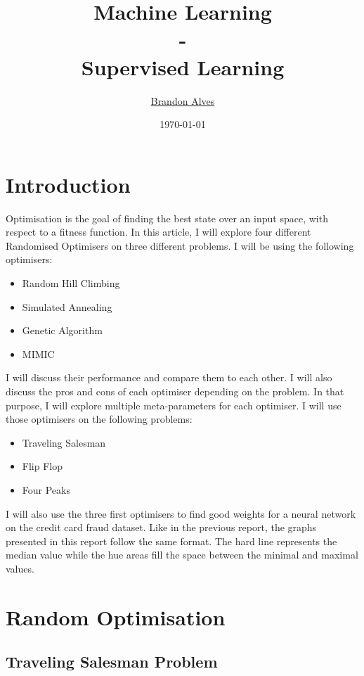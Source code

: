 \documentclass[10pt]{article}
\title{
	Machine Learning
	\\-\\
	Supervised Learning
}
\author{
	\href{mailto:brandon.alves@gatech.edu}{Brandon Alves}
}
\date{\today}
\begin{document}
	\maketitle
	\thispagestyle{empty}
	\tableofcontents
	\section{Introduction}
		Optimisation is the goal of finding the best state over an input space, with respect to a fitness function. In this article, I will explore four different Randomised Optimisers on three different problems. I will be using the following optimisers:
		\begin{itemize}
			\item Random Hill Climbing
			\item Simulated Annealing
			\item Genetic Algorithm
			\item MIMIC
		\end{itemize}
		I will discuss their performance and compare them to each other. I will also discuss the pros and cons of each optimiser depending on the problem. In that purpose, I will explore multiple meta-parameters for each optimiser. I will use those optimisers on the following problems:
		\begin{itemize}
			\item Traveling Salesman
			\item Flip Flop
			\item Four Peaks
		\end{itemize}
		I will also use the three first optimisers to find good weights for a neural network on the credit card fraud dataset. Like in the previous report, the graphs presented in this report follow the same format. The hard line represents the median value while the hue areas fill the space between the minimal and maximal values.
	\section{Random Optimisation}
		\subsection{Traveling Salesman Problem}
\end{document}
